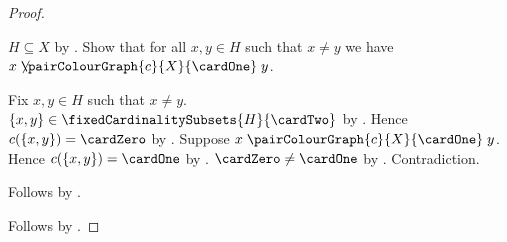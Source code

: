 \begin{proof}
\begin{subproof}
        $H\subseteq X$ by .
        Show that for all $x,y\in H$ such that $x\neq y$ we have
            $x\not\mathrel{\pairColourGraph{c}{X}{\cardOne}}y$.
        \begin{subproof}
            Fix $x,y\in H$ such that $x\neq y$.
            $\{x,y\}\in\fixedCardinalitySubsets{H}{\cardTwo}$ by
                .
            Hence $c(\{x,y\})=\cardZero$ by
                .
            Suppose $x\mathrel{\pairColourGraph{c}{X}{\cardOne}}y$.
            Hence $c(\{x,y\})=\cardOne$ by
                .
            $\cardZero\neq\cardOne$ by .
            Contradiction.
        \end{subproof}
        Follows by .
    \end{subproof}
    Follows by \auto.
\end{proof}
